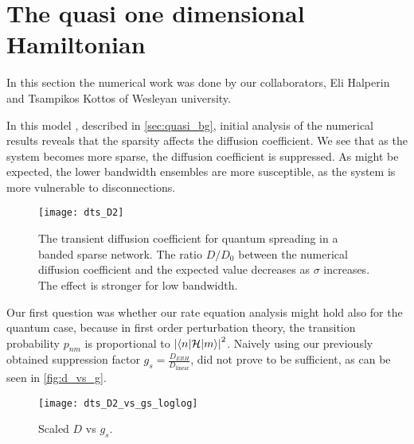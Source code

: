 \section{The quasi one dimensional Hamiltonian}

In this section the numerical work was done by our collaborators,
Eli Halperin and Tsampikos Kottos of Wesleyan university.

In this model , described in \autoref{sec:quasi_bg}, initial analysis of
the numerical results reveals that the sparsity affects the diffusion coefficient.
We see that as the system becomes more sparse, the diffusion coefficient is suppressed. 
As might be expected, the lower bandwidth ensembles are more
susceptible, as the system is more vulnerable to disconnections.


\begin{figure}
\texttt{[image: dts\_D2]}
\caption{The transient diffusion coefficient for quantum spreading in
a banded sparse network. The ratio $D/D_0$ between the numerical diffusion 
coefficient and the expected value decreases as $\sigma$ increases. The effect
is stronger for low bandwidth.}
\end{figure}


Our first question was whether our rate equation analysis might
hold also for the quantum case, because in first order perturbation theory,
the transition probability $p_{nm}$ is proportional to $\left|\left\langle n|\mathcal{H} | m \right\rangle\right|^2$.
Naively using our previously obtained suppression factor $g_s = \frac{D_{ERH}}{D_{\textrm{linear}}}$,
did not prove to be sufficient, as can be seen in \autoref{fig:d_vs_g}.

\begin{figure}
\texttt{[image: dts\_D2\_vs\_gs\_loglog]}
\caption{Scaled $D$ vs $g_s$. }\label{fig:d_vs_g}
\end{figure}
